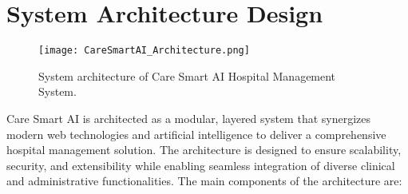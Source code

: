 \documentclass[conference]{IEEEtran}
\begin{document}
\section{System Architecture Design}

\begin{figure}[htbp]
\centering
\texttt{[image: CareSmartAI\_Architecture.png]}
\caption{System architecture of Care Smart AI Hospital Management System.}
\label{fig:architecture}
\end{figure}

Care Smart AI is architected as a modular, layered system that synergizes modern web technologies and artificial intelligence to deliver a comprehensive hospital management solution. The architecture is designed to ensure scalability, security, and extensibility while enabling seamless integration of diverse clinical and administrative functionalities. The main components of the architecture are:
\end{document}

